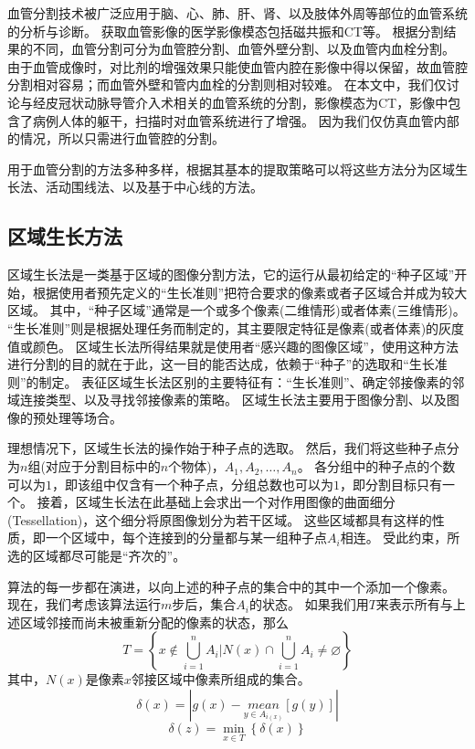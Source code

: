 血管分割技术被广泛应用于脑、心、肺、肝、肾、以及肢体外周等部位的血管系统的分析与诊断。
获取血管影像的医学影像模态包括磁共振和CT等。
根据分割结果的不同，血管分割可分为血管腔分割、血管外壁分割、以及血管内血栓分割\cite{Lesage2009Review}。
由于血管成像时，对比剂的增强效果只能使血管内腔在影像中得以保留，故血管腔分割相对容易；而血管外壁和管内血栓的分割则相对较难。
在本文中，我们仅讨论与经皮冠状动脉导管介入术相关的血管系统的分割，影像模态为CT，影像中包含了病例人体的躯干，扫描时对血管系统进行了增强。
因为我们仅仿真血管内部的情况，所以只需进行血管腔的分割。

用于血管分割的方法多种多样，根据其基本的提取策略可以将这些方法分为区域生长法、活动围线法、以及基于中心线的方法。

\subsection{区域生长方法}

区域生长法是一类基于区域的图像分割方法，它的运行从最初给定的“种子区域”开始，根据使用者预先定义的“生长准则”把符合要求的像素或者子区域合并成为较大区域。
其中，“种子区域”通常是一个或多个像素(二维情形)或者体素(三维情形)。
“生长准则”则是根据处理任务而制定的，其主要限定特征是像素(或者体素)的灰度值或颜色\cite{Gonzalez2004Matlab}。
区域生长法所得结果就是使用者“感兴趣的图像区域”，使用这种方法进行分割的目的就在于此，这一目的能否达成，依赖于“种子”的选取和“生长准则”的制定。
表征区域生长法区别的主要特征有：“生长准则”、确定邻接像素的邻域连接类型、以及寻找邻接像素的策略\cite{Ibanez2005ITKGuide}。
区域生长法主要用于图像分割、以及图像的预处理等场合。

理想情况下，区域生长法的操作始于种子点的选取。
然后，我们将这些种子点分为$n$组(对应于分割目标中的$n$个物体)，$A_1, A_2, \ldots, A_n$。
各分组中的种子点的个数可以为$1$，即该组中仅含有一个种子点，分组总数也可以为$1$，即分割目标只有一个。
接着，区域生长法在此基础上会求出一个对作用图像的曲面细分(Tessellation)，这个细分将原图像划分为若干区域。
这些区域都具有这样的性质，即一个区域中，每个连接到的分量都与某一组种子点$A_i$相连。
受此约束，所选的区域都尽可能是“齐次的”\cite{Adams1994SRG}。

算法的每一步都在演进，以向上述的种子点的集合中的其中一个添加一个像素。
现在，我们考虑该算法运行$m$步后，集合$A_i$的状态。
如果我们用$T$来表示所有与上述区域邻接而尚未被重新分配的像素的状态，那么
\begin{equation}
T = \left\{x\notin\bigcup_{i=1}^{n}A_i|N(x)\cap\bigcup_{i=1}^{n}A_i\neq\varnothing\right\}
\end{equation}
其中，$N(x)$是像素$x$邻接区域中像素所组成的集合。
\begin{equation}
\delta(x)=\left|g(x)-\underset{y\in A_{i(x)}}{mean}[g(y)]\right|
\end{equation}
\begin{equation}
\delta(z)=\min\limits_{x\in T}{\left\{\delta(x)\right\}}
\end{equation}

